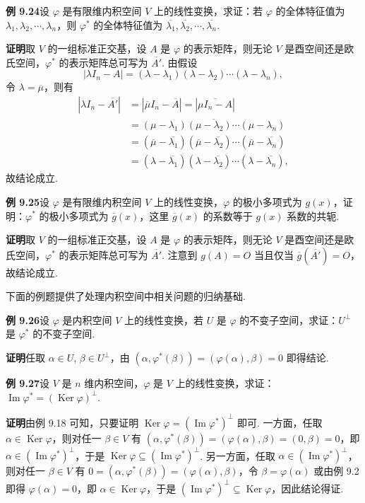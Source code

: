 \documentclass[UTF8, 12pt, fontset=fandol, oneside]{ctexart}
\begin{document}
\noindent\textbf{例 9.24}\quad 设 $\varphi$ 是有限维内积空间 $V$ 上的线性变换，求证：若 $\varphi$ 的全体特征值为 $\lambda_1,\lambda_2,\cdots,\lambda_n$，则 $\varphi^*$ 的全体特征值为 $\overline{\lambda_1},\overline{\lambda_2},\cdots,\overline{\lambda_n}$.

\noindent\textbf{证明}\quad 取 $V$ 的一组标准正交基，设 $A$ 是 $\varphi$ 的表示矩阵，则无论 $V$ 是酉空间还是欧氏空间，$\varphi^*$ 的表示矩阵总可写为 $\overline{A'}$. 由假设
\[
|\lambda I_n-A|=(\lambda-\lambda_1)(\lambda-\lambda_2)\cdots(\lambda-\lambda_n),
\]
令 $\lambda=\overline{\mu}$，则有
\[
\begin{aligned}
|\lambda I_n-\overline{A'}|
&=|\overline{\mu}I_n-\overline{A}|=|\overline{\mu I_n-A}|\\
&=\overline{(\mu-\lambda_1)(\mu-\lambda_2)\cdots(\mu-\lambda_n)}\\
&=(\overline{\mu}-\overline{\lambda_1})(\overline{\mu}-\overline{\lambda_2})\cdots(\overline{\mu}-\overline{\lambda_n})\\
&=(\lambda-\overline{\lambda_1})(\lambda-\overline{\lambda_2})\cdots(\lambda-\overline{\lambda_n}),
\end{aligned}
\]
故结论成立.

\noindent\textbf{例 9.25}\quad 设 $\varphi$ 是有限维内积空间 $V$ 上的线性变换，$\varphi$ 的极小多项式为 $g(x)$，证明：$\varphi^*$ 的极小多项式为 $\overline{g}(x)$，这里 $\overline{g}(x)$ 的系数等于 $g(x)$ 系数的共轭.

\noindent\textbf{证明}\quad 取 $V$ 的一组标准正交基，设 $A$ 是 $\varphi$ 的表示矩阵，则无论 $V$ 是酉空间还是欧氏空间，$\varphi^*$ 的表示矩阵总可写为 $\overline{A'}$. 注意到 $g(A)=O$ 当且仅当 $\overline{g}(\overline{A'})=O$，故结论成立.

下面的例题提供了处理内积空间中相关问题的归纳基础.

\noindent\textbf{例 9.26}\quad 设 $\varphi$ 是内积空间 $V$ 上的线性变换，若 $U$ 是 $\varphi$ 的不变子空间，求证：$U^\perp$ 是 $\varphi^*$ 的不变子空间.

\noindent\textbf{证明}\quad 任取 $\alpha\in U$, $\beta\in U^\perp$，由 $(\alpha,\varphi^*(\beta))=(\varphi(\alpha),\beta)=0$ 即得结论.

\noindent\textbf{例 9.27}\quad 设 $V$ 是 $n$ 维内积空间，$\varphi$ 是 $V$ 上的线性变换，求证：$\operatorname{Im}\varphi^*=(\operatorname{Ker}\varphi)^\perp$.

\noindent\textbf{证明}\quad 由例 9.18 可知，只要证明 $\operatorname{Ker}\varphi=(\operatorname{Im}\varphi^*)^\perp$ 即可. 一方面，任取 $\alpha\in\operatorname{Ker}\varphi$，则对任一 $\beta\in V$ 有 $(\alpha,\varphi^*(\beta))=(\varphi(\alpha),\beta)=(0,\beta)=0$，即 $\alpha\in(\operatorname{Im}\varphi^*)^\perp$，于是 $\operatorname{Ker}\varphi\subseteq(\operatorname{Im}\varphi^*)^\perp$. 另一方面，任取 $\alpha\in(\operatorname{Im}\varphi^*)^\perp$，则对任一 $\beta\in V$ 有 $0=(\alpha,\varphi^*(\beta))=(\varphi(\alpha),\beta)$，令 $\beta=\varphi(\alpha)$ 或由例 9.2 即得 $\varphi(\alpha)=0$，即 $\alpha\in\operatorname{Ker}\varphi$，于是 $(\operatorname{Im}\varphi^*)^\perp\subseteq\operatorname{Ker}\varphi$，因此结论得证.
\end{document}
